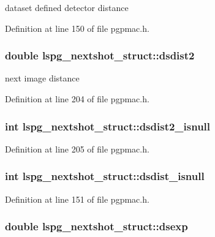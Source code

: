 dataset defined detector distance 

Definition at line 150 of file pgpmac.h.\hypertarget{structlspg__nextshot__struct_a516827749068577217b27860a01e6041}{
\subsubsection[{dsdist2}]{\setlength{\rightskip}{0pt plus 5cm}double {\bf lspg\_\-nextshot\_\-struct::dsdist2}}}
\label{structlspg__nextshot__struct_a516827749068577217b27860a01e6041}


next image distance 

Definition at line 204 of file pgpmac.h.\hypertarget{structlspg__nextshot__struct_a7fce65f4719a4a8110006f8b72eec3f7}{
\subsubsection[{dsdist2\_\-isnull}]{\setlength{\rightskip}{0pt plus 5cm}int {\bf lspg\_\-nextshot\_\-struct::dsdist2\_\-isnull}}}
\label{structlspg__nextshot__struct_a7fce65f4719a4a8110006f8b72eec3f7}


Definition at line 205 of file pgpmac.h.\hypertarget{structlspg__nextshot__struct_ac6f2bdc7b023d933509bf74af7b169f9}{
\subsubsection[{dsdist\_\-isnull}]{\setlength{\rightskip}{0pt plus 5cm}int {\bf lspg\_\-nextshot\_\-struct::dsdist\_\-isnull}}}
\label{structlspg__nextshot__struct_ac6f2bdc7b023d933509bf74af7b169f9}


Definition at line 151 of file pgpmac.h.\hypertarget{structlspg__nextshot__struct_a063e4c99201a763c2eb048acfc855efa}{
\subsubsection[{dsexp}]{\setlength{\rightskip}{0pt plus 5cm}double {\bf lspg\_\-nextshot\_\-struct::dsexp}}}
\label{structlspg__nextshot__struct_a063e4c99201a763c2eb048acfc855efa}


